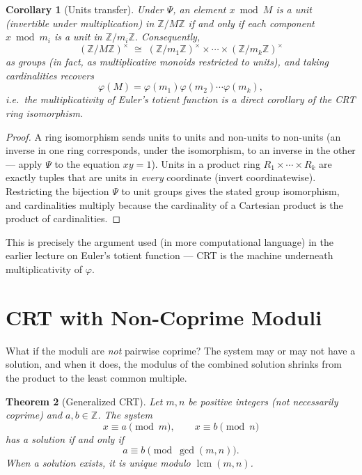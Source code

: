 \documentclass[11pt]{article}
\newtheorem{theorem}{Theorem}[section]
\newtheorem{corollary}[theorem]{Corollary}
\theoremstyle{definition}
\theoremstyle{remark}
\newcommand{\Z}{\mathbb{Z}}
\DeclareMathOperator{\lcmop}{lcm}
\begin{document}
\begin{corollary}[Units transfer]\label{cor:units}
Under $\Psi$, an element $x \bmod M$ is a unit (invertible under multiplication) in $\Z/M\Z$ if and only if each component $x \bmod m_i$ is a unit in $\Z/m_i\Z$. Consequently,
\[
(\Z/M\Z)^\times \;\cong\; (\Z/m_1\Z)^\times \times \cdots \times (\Z/m_k\Z)^\times
\]
as groups (in fact, as multiplicative monoids restricted to units), and taking cardinalities recovers
\[
\varphi(M) = \varphi(m_1)\varphi(m_2)\cdots\varphi(m_k),
\]
i.e.\ the multiplicativity of Euler's totient function is a direct corollary of the CRT ring isomorphism.
\end{corollary}

\begin{proof}
A ring isomorphism sends units to units and non-units to non-units (an inverse in one ring corresponds, under the isomorphism, to an inverse in the other — apply $\Psi$ to the equation $xy=1$). Units in a product ring $R_1\times\cdots\times R_k$ are exactly tuples that are units in \emph{every} coordinate (invert coordinatewise). Restricting the bijection $\Psi$ to unit groups gives the stated group isomorphism, and cardinalities multiply because the cardinality of a Cartesian product is the product of cardinalities.
\end{proof}

\noindent This is precisely the argument used (in more computational language) in the earlier lecture on Euler's totient function — CRT is the machine underneath multiplicativity of $\varphi$.

\section{CRT with Non-Coprime Moduli}

What if the moduli are \emph{not} pairwise coprime? The system may or may not have a solution, and when it does, the modulus of the combined solution shrinks from the product to the least common multiple.

\begin{theorem}[Generalized CRT]\label{thm:generalizedcrt}
Let $m,n$ be positive integers (not necessarily coprime) and $a,b \in \Z$. The system
\[
x\equiv a\pmod m, \qquad x \equiv b \pmod n
\]
has a solution if and only if
\[
a \equiv b \pmod{\gcd(m,n)}.
\]
When a solution exists, it is unique modulo $\lcmop(m,n)$.
\end{theorem}
\end{document}
